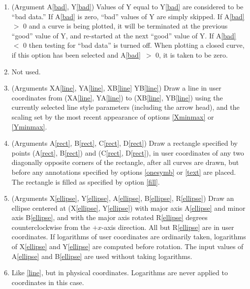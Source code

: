 \documentclass[twoside]{MATH77}
\begin{document}
\begin{multicols}{2}
\begin{enumerate}
\item\label{bad} (Argument A\ref{bad}, Y\ref{bad}) Values of Y equal to
        Y\ref{bad} are considered to be ``bad data.''  If A\ref{bad} is zero,
        ``bad'' values of Y are simply skipped.  If A\ref{bad}~$>$ 0 and a
        curve is being plotted, it will be terminated at the previous
        ``good'' value of Y, and re-started at the next ``good'' value of Y.
        If A\ref{bad}~$<$ 0 then testing for ``bad data'' is turned off.
        When plotting a closed curve, if this option has been selected and
        A\ref{bad}~$>$ 0, it is taken to be zero.

\item\label{nouse_1}   Not used.

\item\label{line} (Arguments XA\ref{line}, YA\ref{line}, XB\ref{line}
        YB\ref{line})  Draw a line in user coordinates from
        (XA\ref{line}, YA\ref{line}) to (XB\ref{line}, YB\ref{line})
        using the currently selected line style parameters (including the
        arrow head), and the scaling set by the most recent appearance of
        options \ref{Xminmax} or \ref{Yminmax}.

\item\label{rect} (Arguments A\ref{rect}, B\ref{rect}, C\ref{rect},
        D\ref{rect}) Draw a rectangle specified by points (A\ref{rect},
        B\ref{rect}) and (C\ref{rect}, D\ref{rect}), in user
        coordinates of any two diagonally opposite corners of the
        rectangle, after all curves are drawn, but before any annotations
        specified by options \ref{onesymb} or \ref{text} are placed.
        The rectangle is filled as specified by option \ref{fill}.

\item\label{ellipse} (Arguments X\ref{ellipse}, Y\ref{ellipse},
        A\ref{ellipse}, B\ref{ellipse}, R\ref{ellipse}) Draw an ellipse
        centered at (X\ref{ellipse}, Y\ref{ellipse}) with major axis
        A\ref{ellipse} and minor axis B\ref{ellipse}, and with the
        major axis rotated R\ref{ellipse} degrees counterclockwise from
        the $+x$-axis direction.  All but R\ref{ellipse} are in user
        coordinates.  If logarithms of user coordinates are
        ordinarily taken, logarithms of X\ref{ellipse} and Y\ref{ellipse}
        are computed before rotation.  The input values of A\ref{ellipse}
        and B\ref{ellipse} are used without taking logarithms.

\item\label{pline} Like \ref{line}, but in physical coordinates.
        Logarithms are never applied to coordinates in this case.


\end{enumerate}
\end{multicols}
\end{document}
